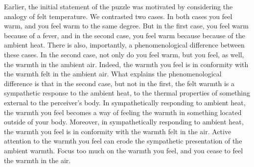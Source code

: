 Earlier, the initial statement of the puzzle was motivated by considering the analogy of felt temperature. We contrasted two cases. In both cases you feel warm, and you feel warm to the same degree. But in the first case, you feel warm because of a fever, and in the second case, you feel warm because because of the ambient heat. There is also, importantly, a phenomenological difference between these cases. In the second case, not only do you feel warm, but you feel, as well, the warmth in the ambient air. Indeed, the warmth you feel is in conformity with the warmth felt in the ambient air. What explains the phenomenological difference is that in the second case, but not in the first, the felt warmth is a sympathetic response to the ambient heat, to the thermal properties of something external to the perceiver's body. In sympathetically responding to ambient heat, the warmth you feel becomes a way of feeling the warmth in something located outside of your body. Moreover, in sympathetically responding to ambient heat, the warmth you feel is in conformity with the warmth felt in the air. Active attention to the warmth you feel can erode the sympathetic presentation of the ambient warmth. Focus too much on the warmth you feel, and you cease to feel the warmth in the air.


